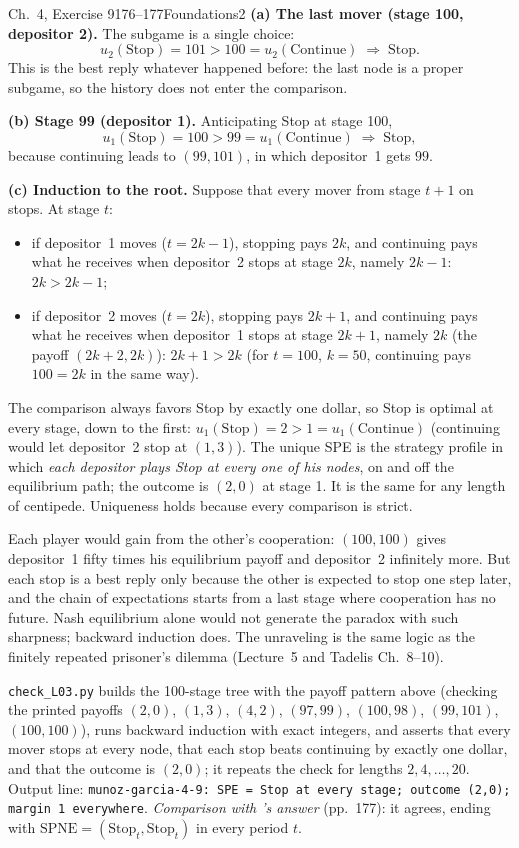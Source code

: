 \begin{exsol}{\MG{} Ch.~4, Exercise 9}{176--177}{Foundations}{2}
\textbf{(a) The last mover (stage 100, depositor 2).} The subgame is a single choice:
\[
  u_2(\text{Stop}) = 101 > 100 = u_2(\text{Continue}) \;\Rightarrow\; \text{Stop}.
\]
This is the best reply whatever happened before: the last node is a proper subgame, so the history does not
enter the comparison.

\textbf{(b) Stage 99 (depositor 1).} Anticipating Stop at stage 100,
\[
  u_1(\text{Stop}) = 100 > 99 = u_1(\text{Continue}) \;\Rightarrow\; \text{Stop},
\]
because continuing leads to $(99,101)$, in which depositor~1 gets $99$.

\textbf{(c) Induction to the root.} Suppose that every mover from stage $t+1$ on stops. At stage $t$:
\begin{itemize}
  \item if depositor~1 moves ($t = 2k-1$), stopping pays $2k$, and continuing pays what he receives when
  depositor~2 stops at stage $2k$, namely $2k-1$: $2k > 2k-1$;
  \item if depositor~2 moves ($t = 2k$), stopping pays $2k+1$, and continuing pays what he receives when
  depositor~1 stops at stage $2k+1$, namely $2k$ (the payoff $(2k+2, 2k)$): $2k+1 > 2k$ (for $t = 100$,
  $k = 50$, continuing pays $100 = 2k$ in the same way).
\end{itemize}
The comparison always favors Stop by exactly one dollar, so Stop is optimal at every stage, down to the first:
$u_1(\text{Stop}) = 2 > 1 = u_1(\text{Continue})$ (continuing would let depositor~2 stop at $(1,3)$).
The unique SPE is the strategy profile in which \emph{each depositor plays Stop at every one of his
nodes}, on and off the equilibrium path; the outcome is $(2,0)$ at stage 1. It is the same for any length
of centipede. Uniqueness holds because every comparison is strict.

\interp Each player would gain from the other's cooperation: $(100,100)$ gives depositor~1 fifty times his
equilibrium payoff and depositor~2 infinitely more. But each stop is a best reply only because the other is expected to stop one step later,
and the chain of expectations starts from a last stage where cooperation has no future. Nash equilibrium
alone would not generate the paradox with such sharpness; backward induction does. The unraveling is
the same logic as the finitely repeated prisoner's dilemma (Lecture~5 and Tadelis Ch.~8--10).

\verify \texttt{check\_L03.py} builds the 100-stage tree with the payoff pattern above (checking the
printed payoffs $(2,0)$, $(1,3)$, $(4,2)$, $(97,99)$, $(100,98)$, $(99,101)$, $(100,100)$), runs backward
induction with exact integers, and asserts that every mover stops at every node, that each stop beats
continuing by exactly one dollar, and that the outcome is $(2,0)$; it repeats the check for lengths
$2, 4, \dots, 20$. Output line: \texttt{munoz-garcia-4-9: SPE = Stop at every stage; outcome (2,0); margin 1
everywhere}. \emph{Comparison with \MG{}'s answer} (pp.~177): it agrees, ending with
$\mathrm{SPNE} = (\text{Stop}_t, \text{Stop}_t)$ in every period $t$.


\end{exsol}
